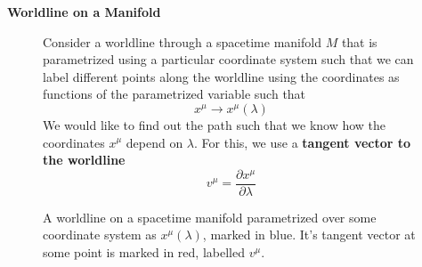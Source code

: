 \documentclass{article}
\begin{document}
 		\begin{exmp}
 			\textbf{Worldline on a Manifold}
 			\begin{figure}[h]
 				\begin{minipage}{0.4\textwidth}
 					\center
 					\caption{A worldline on a spacetime manifold parametrized over some coordinate system as $x^{\mu} (\lambda)$, marked in blue. It's tangent vector at some point is marked in red, labelled $v^\mu$.}
 				\end{minipage}
 				\begin{minipage}{0.56\textwidth}
 					\begin{spacing}{1.5}
 						Consider a worldline through a spacetime manifold $M$ that is parametrized using a particular coordinate system such that we can label different points along the worldline using the coordinates as functions of the parametrized variable such that
 						$$ x^\mu \to x^\mu (\lambda)$$
 						We would like to find out the path such that we know how the coordinates $x^\mu$ depend on $\lambda$. For this, we use a \textbf{tangent vector to the worldline}
 						\begin{equation}
 							\label{eq:TangetVectorWorldline}
 							\boxed{v^\mu = \frac{\partial x^\mu}{\partial \lambda}}
 						\end{equation}
 					\end{spacing}
 				\end{minipage}
 			\end{figure}
 		

\end{exmp}
\end{document}
